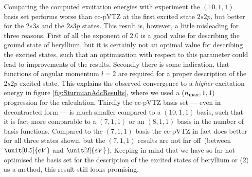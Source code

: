 Comparing the computed excitation energies with experiment
the $(10,1,1)$ basis set
performs worse than cc-pVTZ at the first excited state $2s2p$,
but better for the $2s3s$ and the $2s3p$ states.
This result is, however, a little misleading for three reasons.
First of all the \CS exponent of $2.0$ is a good value for describing
the ground state of beryllium, but it is certainly not an optimal value
for describing the excited states,
such that an optimisation with respect to this parameter could lead
to improvements of the \CS results.
Secondly there is some indication, that functions of angular momentum $l = 2$
are required for a proper description of the $2s2p$ excited state.
This explains the observed convergence to a \emph{higher} excitation energy
in figure \ref{fig:SturmianAdcResults},
where we used a $(n_\text{max}, 1,1)$ progression for the calculation.
Thirdly the cc-pVTZ basis set --- even in decontracted form ---
is much smaller compared to a $(10,1,1)$ \CS basis,
such that it is fact more comparable to a $(7,1,1)$ or an $(8,1,1)$ \CS
basis in the number of basis functions.
Compared to the $(7,1,1)$ basis the cc-pVTZ in fact does better
for all three states shown,
but the $(7,1,1)$ results are not far off~(between $\unit[0.5]{eV}$
and $\unit[2]{eV}$).
Keeping in mind that we have so far not optimised
the \CS basis set for the description of the excited states
of beryllium or {\ADC}(2) as a method,
this result still looks promising.


%
